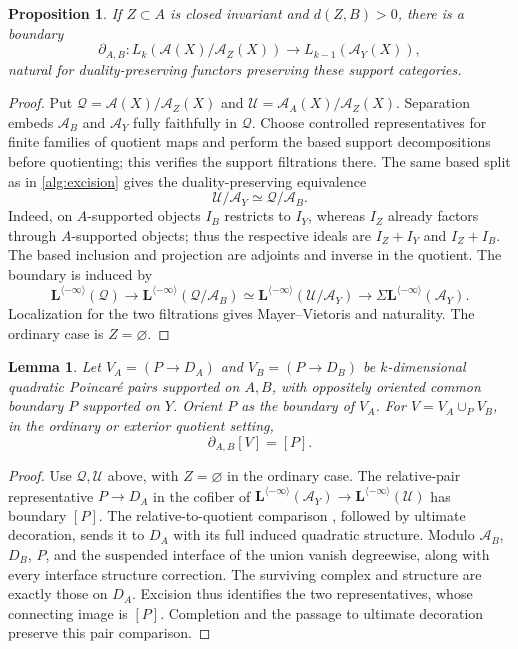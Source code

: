 \documentclass[11pt]{amsart}
\numberwithin{equation}{section}
\newtheorem{proposition}[proposition]{Proposition}
\newtheorem{lemma}[lemma]{Lemma}
\theoremstyle{definition}
\theoremstyle{remark}
\newcommand{\Lspec}{\mathbf L^{\langle-\infty\rangle}}
\begin{document}
\begin{proposition}\label{prop:exterior-boundary}
If $Z\subset A$ is closed invariant and $d(Z,B)>0$, there is a boundary
\begin{equation}\label{eq:exterior-boundary}
 \partial_{A,B}:L_k(\mathcal A(X)/\mathcal A_Z(X))
               \longrightarrow L_{k-1}(\mathcal A_Y(X)),
\end{equation}
natural for duality-preserving functors preserving these support categories.
\end{proposition}
\begin{proof}
Put $\mathcal Q=\mathcal A(X)/\mathcal A_Z(X)$ and
$\mathcal U=\mathcal A_A(X)/\mathcal A_Z(X)$.
Separation embeds $\mathcal A_B$ and $\mathcal A_Y$ fully faithfully in
$\mathcal Q$. Choose controlled representatives for finite families of
quotient maps and perform the based support decompositions before
quotienting; this verifies the support filtrations there. The same based
split as in \cref{alg:excision} gives the duality-preserving equivalence
\begin{equation}\label{eq:exterior-excision}
 \mathcal U/\mathcal A_Y\simeq\mathcal Q/\mathcal A_B.
\end{equation}
Indeed, on $A$-supported objects $I_B$ restricts to $I_Y$, whereas $I_Z$
already factors through $A$-supported objects; thus the respective ideals
are $I_Z+I_Y$ and $I_Z+I_B$. The based inclusion and projection are
adjoints and inverse in the quotient. The boundary is induced by
\[
 \Lspec(\mathcal Q)\longrightarrow\Lspec(\mathcal Q/\mathcal A_B)
 \simeq\Lspec(\mathcal U/\mathcal A_Y)
 \longrightarrow\Sigma\Lspec(\mathcal A_Y).
\]
Localization for the two filtrations gives Mayer--Vietoris and naturality.
The ordinary case is $Z=\varnothing$.
\end{proof}

\begin{lemma}\label{lem:union-boundary}
Let $V_A=(P\to D_A)$ and $V_B=(P\to D_B)$ be $k$-dimensional quadratic
Poincar\'e pairs supported on $A,B$, with oppositely oriented common
boundary $P$ supported on $Y$. Orient $P$ as the boundary of $V_A$.
For $V=V_A\cup_PV_B$, in the ordinary or exterior quotient setting,
\begin{equation}\label{eq:union-boundary}
 \partial_{A,B}[V]=[P].
\end{equation}
\end{lemma}
\begin{proof}
Use $\mathcal Q,\mathcal U$ above, with $Z=\varnothing$ in the ordinary
case. The relative-pair representative $P\to D_A$ in the cofiber of
$\Lspec(\mathcal A_Y)\to\Lspec(\mathcal U)$ has boundary $[P]$.
The relative-to-quotient comparison \cite[proof of Theorem 4.1]{CP95},
followed by ultimate decoration, sends it to $D_A$ with its full induced
quadratic structure. Modulo $\mathcal A_B$, $D_B$, $P$, and the
suspended interface of the union vanish degreewise, along with every
interface structure correction. The surviving complex and structure are
exactly those on $D_A$. Excision thus identifies the two representatives,
whose connecting image is $[P]$. Completion and the passage to ultimate
decoration preserve this pair comparison.
\end{proof}
\end{document}
